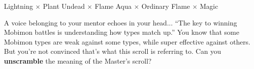 \begin{center}
\begin{tikzpicture}[x=1.3em,y=1.4em]
\end{tikzpicture}

Lightning \(\times\) Plant \hfill
Undead \(\times\) Flame \hfill
Aqua \(\times\) Ordinary \hfill
Flame \(\times\) Magic
\end{center}

A voice belonging to your mentor echoes in your head...
``The key to winning Mobimon battles is understanding how types match up.''
You know that some Mobimon types are weak against some types, while
super effective against others. But you're not convinced that's what this scroll
is referring to. Can you \textbf{unscramble} the meaning of the Master's scroll?


